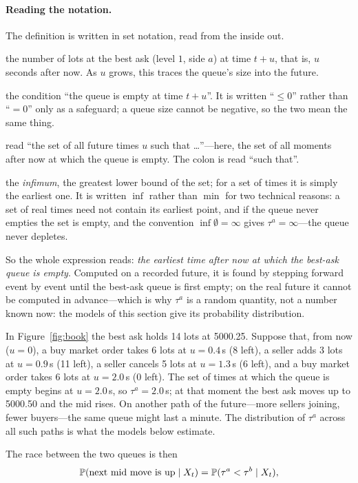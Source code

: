 \paragraph{Reading the notation.} The definition is written in set notation, read from the inside
out.
\begin{description}[leftmargin=1.5em,style=nextline,itemsep=2pt]
\item[$v^{a}_{1,t+u}$] the number of lots at the best ask (level $1$, side $a$) at time $t+u$, that is,
  $u$ seconds after now. As $u$ grows, this traces the queue's size into the future.
\item[$v^{a}_{1,t+u} \le 0$] the condition ``the queue is empty at time $t+u$''. It is written ``$\le
  0$'' rather than ``$= 0$'' only as a safeguard; a queue size cannot be negative, so the two mean the
  same thing.
\item[$\{u > 0 : \ldots\}$] read ``the set of all future times $u$ such that \ldots''---here, the set
  of all moments after now at which the queue is empty. The colon is read ``such that''.
\item[$\inf$] the \emph{infimum}, the greatest lower bound of the set; for a set of times it is
  simply the earliest one. It is written $\inf$ rather than $\min$ for two technical reasons: a set of
  real times need not contain its earliest point, and if the queue never empties the set is empty, and
  the convention $\inf \emptyset = \infty$ gives $\tau^a = \infty$---the queue never depletes.
\end{description}
So the whole expression reads: \emph{the earliest time after now at which the best-ask queue is
empty}. Computed on a recorded future, it is found by stepping forward event by event until the best-ask queue is
first empty; on the real future it cannot be computed in advance---which is why $\tau^a$ is a random quantity, not a number known now: the
models of this section give its probability distribution.

\begin{example}
In Figure~\ref{fig:book} the best ask holds 14 lots at 5000.25. Suppose that, from now ($u = 0$), a
buy market order takes 6 lots at $u = 0.4$\,s (8 left), a seller adds 3 lots at $u = 0.9$\,s (11
left), a seller cancels 5 lots at $u = 1.3$\,s (6 left), and a buy market order takes 6 lots at
$u = 2.0$\,s (0 left). The set of times at which the queue is empty begins at $u = 2.0$\,s, so
$\tau^a = 2.0$\,s; at that moment the best ask moves up to 5000.50 and the mid rises. On another
path of the future---more sellers joining, fewer buyers---the same queue might last a minute. The
distribution of $\tau^a$ across all such paths is what the models below estimate.
\end{example}
The race between the two queues is then
\begin{equation}
  \P(\text{next mid move is up} \mid X_t) = \P(\tau^a < \tau^b \mid X_t),
\end{equation}

